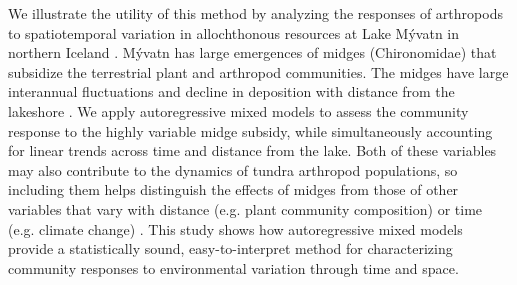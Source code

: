 We illustrate the utility of this method by analyzing the responses of 
arthropods to spatiotemporal variation in allochthonous resources at Lake Mývatn
in northern Iceland \citep{Einarsson2004}.
Mývatn has large emergences of midges (Chironomidae) that subsidize the terrestrial
plant \citep{Gratton2008} and arthropod \citep{Dreyer2012, Sanchez2018} communities.
The midges have large interannual fluctuations and decline
in deposition with distance from the lakeshore \citep{Dreyer2015}.
We apply autoregressive mixed models to assess the community response to the
highly variable midge subsidy, 
while simultaneously accounting for linear trends across time and distance from the lake.
Both of these variables may also contribute to the dynamics of tundra arthropod populations,
so including them helps distinguish the effects of midges from those
of other variables that vary with distance (e.g. plant community composition) or 
time (e.g. climate change) \citep{Bowden2018}.
This study shows how autoregressive mixed models provide a statistically sound, 
easy-to-interpret method for characterizing community responses to
environmental variation through time and space.


